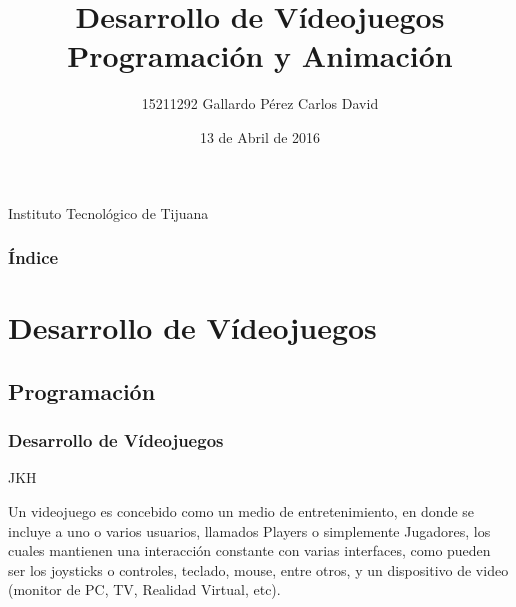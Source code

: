 \documentclass[12 pt]{beamer}
\title{Desarrollo de Vídeojuegos \linebreak Programación y Animación}
\author{15211292 Gallardo Pérez Carlos David}
\date{13 de Abril de 2016}
\begin{document}
		\titlepage
\begin{center}
		Instituto Tecnológico de Tijuana
		\newline \newline \newline \newline 
\end{center}
		\scriptsize
		
\begin{frame}
		\newpage \newpage \newpage
		\frametitle{Índice}
		\tableofcontents
\end{frame}
	
\section{Desarrollo de Vídeojuegos}
\subsection{Programación}
\begin{frame}
\begin{center}
\frametitle{Desarrollo de Vídeojuegos}
		JKH
		\cite{DVJ001}
\end{center}
\end{frame}
\begin{definition}
			Un videojuego es concebido como un medio de entretenimiento, en donde se incluye a uno o
varios usuarios, llamados Players o simplemente Jugadores, los cuales mantienen una interacción
constante con varias interfaces, como pueden ser los joysticks o controles, teclado, mouse, entre otros,
y un dispositivo de video (monitor de PC, TV, Realidad Virtual, etc).
		\end{definition}


\end{document}
